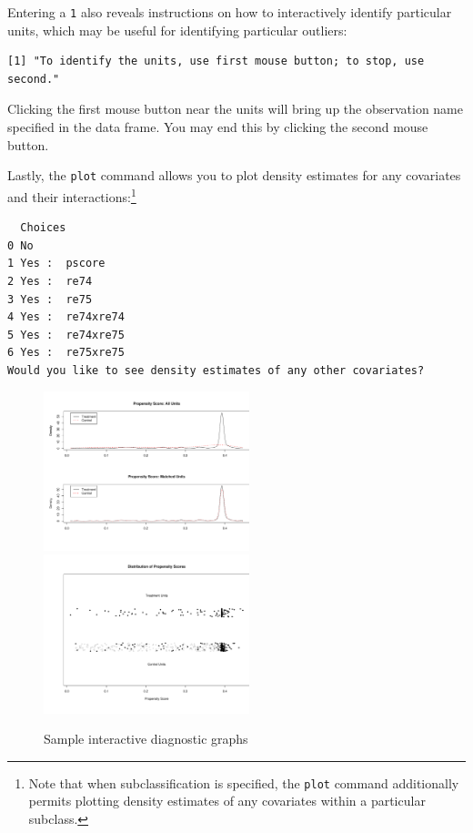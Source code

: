 \documentclass[oneside,letterpaper,titlepage]{article}
\begin{document}
Entering a \texttt{1} also reveals instructions on how to
interactively identify particular units, which may be useful for
identifying particular outliers: 

\begin{verbatim}
[1] "To identify the units, use first mouse button; to stop, use
second."
\end{verbatim}

Clicking the first mouse button near the units will bring up the
observation name specified in the data frame.  You may end this by
clicking the second mouse button.

Lastly, the \texttt{plot} command allows you to plot density estimates
for any covariates and their interactions:\footnote{Note that when
  subclassification is specified, the \texttt{plot} command
  additionally permits plotting density estimates of any covariates
  within a particular subclass.}

\begin{verbatim}
  Choices         
0 No              
1 Yes :  pscore   
2 Yes :  re74     
3 Yes :  re75     
4 Yes :  re74xre74
5 Yes :  re74xre75
6 Yes :  re75xre75
Would you like to see density estimates of any other covariates?
\end{verbatim}

\begin{figure}[h]
  \begin{center}
    \includegraphics[width=2.35in,angle=0]{figs/f2figa}
    \includegraphics[width=2.35in,angle=0]{figs/f2figb}
    \hfill
    \caption{Sample interactive diagnostic graphs}
    \label{f2diags}
  \end{center}
\end{figure}
\end{document}
